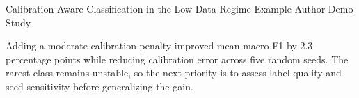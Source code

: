 \documentclass[10pt,a4paper]{article}
\begin{document}

\ReportHeader
    {Calibration-Aware Classification in the Low-Data Regime}
    {Example Author}
    {Demo Study}


%
\begin{reportabstract}

Adding a moderate calibration penalty improved mean macro F1 by
2.3 percentage points while reducing calibration error across five
random seeds. The rarest class remains unstable, so the next priority
is to assess label quality and seed sensitivity before generalizing the gain.

\end{reportabstract}


\vspace{3mm}
\end{document}
